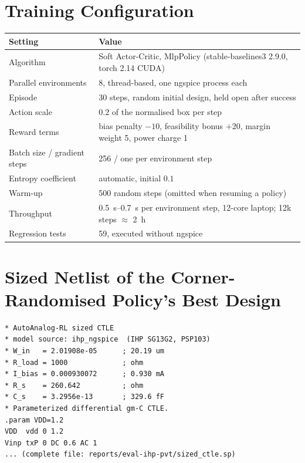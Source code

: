\documentclass[10pt,a4paper]{article}
\begin{document}
\appendix

\section{Training Configuration}
\begin{table}[h]\centering\small
\begin{tabular}{@{}ll@{}}
\toprule
\textbf{Setting} & \textbf{Value}\\
\midrule
Algorithm & Soft Actor-Critic, MlpPolicy (stable-baselines3 2.9.0, torch 2.14 CUDA)\\
Parallel environments & 8, thread-based, one ngspice process each\\
Episode & 30 steps, random initial design, held open after success\\
Action scale & $0.2$ of the normalised box per step\\
Reward terms & bias penalty $-10$, feasibility bonus $+20$, margin weight 5, power charge 1\\
Batch size / gradient steps & 256 / one per environment step\\
Entropy coefficient & automatic, initial $0.1$\\
Warm-up & 500 random steps (omitted when resuming a policy)\\
Throughput & \SIrange{0.5}{0.7}{\second} per environment step, 12-core laptop; 12k steps $\approx$ \SI{2}{\hour}\\
Regression tests & 59, executed without ngspice\\
\bottomrule
\end{tabular}
\end{table}

\section{Sized Netlist of the Corner-Randomised Policy's Best Design}
\begin{lstlisting}
* AutoAnalog-RL sized CTLE
* model source: ihp_ngspice  (IHP SG13G2, PSP103)
* W_in   = 2.01908e-05      ; 20.19 um
* R_load = 1000             ; ohm
* I_bias = 0.000930072      ; 0.930 mA
* R_s    = 260.642          ; ohm
* C_s    = 3.2956e-13       ; 329.6 fF
* Parameterized differential gm-C CTLE.
.param VDD=1.2
VDD  vdd 0 1.2
Vinp txP 0 DC 0.6 AC 1
... (complete file: reports/eval-ihp-pvt/sized_ctle.sp)
\end{lstlisting}
\end{document}
